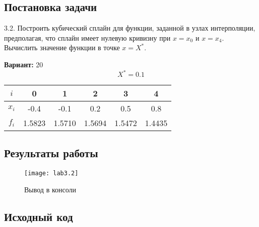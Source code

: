\subsection{Постановка задачи}
3.2. Построить кубический сплайн для функции, заданной в узлах интерполяции, предполагая, что сплайн имеет нулевую кривизну при $x=x_0$ и $x=x_4$. Вычислить значение функции в точке $x=X^*$.

{\bfseries Вариант:} 20
    \begin{equation}
		X^*=0.1
    \end{equation}
    \begin{center}
        \begin{tabular}{ |c|c|c|c|c|c| } 
			 \hline
			 $i$ & 0 & 1 & 2 & 3 & 4 \\ 
			 \hline
			 $x_i$ & -0.4 & -0.1 & 0.2 & 0.5 & 0.8 \\ 
			 \hline
			 $f_i$ & 1.5823 & 1.5710 & 1.5694 & 1.5472 & 1.4435 \\ 
			 \hline
        \end{tabular}
    \end{center}
\pagebreak

\subsection{Результаты работы}
\begin{figure}[h!]
\centering
\texttt{[image: lab3.2]}
\caption{Вывод в консоли}
\end{figure}


\subsection{Исходный код}

\pagebreak